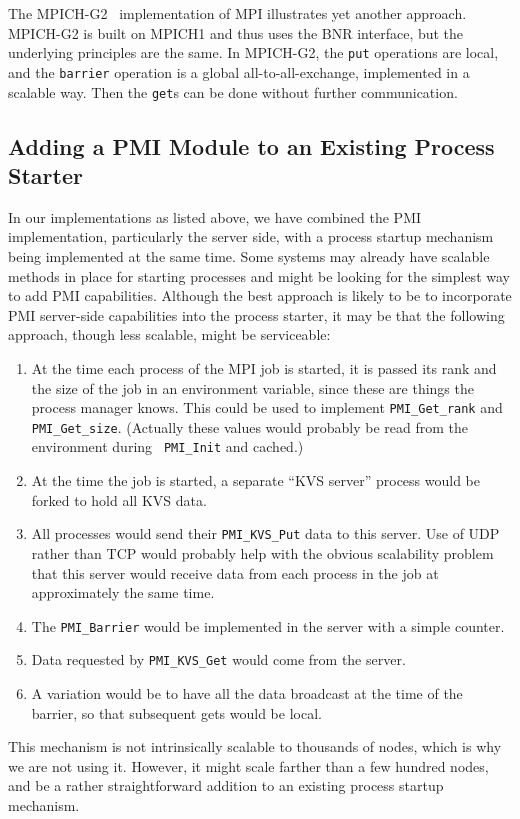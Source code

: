 \documentclass[11pt]{article}
\begin{document}
The MPICH-G2~\cite{karonis02:mpich-g2} implementation of MPI illustrates
yet another approach.  MPICH-G2 is built on MPICH1 and thus uses the BNR
interface, but the underlying principles are the same.  In MPICH-G2, the
{\tt put} operations are local, and the {\tt barrier} operation is a
global all-to-all-exchange, implemented in a scalable way.  Then the
{\tt get}s can be done without further communication. 


\subsection{Adding a PMI Module to an Existing Process Starter}
\label{sec:adding}

In our implementations as listed above, we have combined the PMI
implementation, particularly the server side, with a process startup
mechanism being implemented at the same time.  Some systems may already
have scalable methods in place for starting processes and might be
looking for the simplest way to add PMI capabilities.  Although the 
best approach is likely to be to incorporate PMI server-side
capabilities into the process starter, it may be that the following
approach, though less scalable, might be serviceable:
\begin{enumerate}
\item At the time each process of the MPI job is started, it is passed
  its rank and the size of the job in an environment variable, since
  these are things the process manager knows.  This could be used to
  implement {\tt PMI\_Get\_rank} and {\tt PMI\_Get\_size}.  (Actually
  these values would probably be read from the environment during {\tt
    PMI\_Init} and cached.)
\item At the time the job is started, a separate ``KVS server'' process
  would be forked to hold all KVS data.
\item All processes would send their {\tt PMI\_KVS\_Put} data to this
  server.  Use of UDP rather than TCP would probably help with the
  obvious scalability problem that this server would receive data from
  each process in the job at approximately the same time.
\item The {\tt PMI\_Barrier} would be implemented in the server with a
  simple counter.
\item Data requested by {\tt PMI\_KVS\_Get} would come from the server.
\item A variation would be to have all the data broadcast at the time of
  the barrier, so that subsequent gets would be local.
\end{enumerate}
This mechanism is not intrinsically scalable to thousands of nodes,
which is why we are not using it.  However, it might scale farther than
a few hundred nodes, and be a rather straightforward addition to an
existing process startup mechanism.
\end{document}
